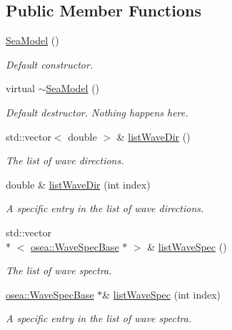 \subsection*{Public Member Functions}
\begin{DoxyCompactItemize}
\item 
\hyperlink{classosea_1_1_sea_model_a39eab0ab2e207a2efc3695b4c6d31832}{Sea\-Model} ()
\begin{DoxyCompactList}\small\item\em Default constructor. \end{DoxyCompactList}\item 
virtual \hyperlink{classosea_1_1_sea_model_a45bd26ccfb489ea75d972b8696f99d7b}{$\sim$\-Sea\-Model} ()
\begin{DoxyCompactList}\small\item\em Default destructor. Nothing happens here. \end{DoxyCompactList}\item 
std\-::vector$<$ double $>$ \& \hyperlink{classosea_1_1_sea_model_ae316b21bbd31b946b250e80b97fe0ccd}{list\-Wave\-Dir} ()
\begin{DoxyCompactList}\small\item\em The list of wave directions. \end{DoxyCompactList}\item 
double \& \hyperlink{classosea_1_1_sea_model_aa22f61bc0a138899966edd3b3f3c9701}{list\-Wave\-Dir} (int index)
\begin{DoxyCompactList}\small\item\em A specific entry in the list of wave directions. \end{DoxyCompactList}\item 
std\-::vector\\*
$<$ \hyperlink{classosea_1_1_wave_spec_base}{osea\-::\-Wave\-Spec\-Base} $\ast$ $>$ \& \hyperlink{classosea_1_1_sea_model_a5779eb123781d9507b68607e956e6365}{list\-Wave\-Spec} ()
\begin{DoxyCompactList}\small\item\em The list of wave spectra. \end{DoxyCompactList}\item 
\hyperlink{classosea_1_1_wave_spec_base}{osea\-::\-Wave\-Spec\-Base} $\ast$\& \hyperlink{classosea_1_1_sea_model_a937a3bc65846328b5cfd158976b93f0a}{list\-Wave\-Spec} (int index)
\begin{DoxyCompactList}\small\item\em A specific entry in the list of wave spectra. \end{DoxyCompactList}\item 

\end{DoxyCompactItemize}
